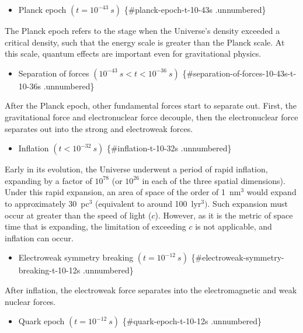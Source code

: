 \documentclass[11pt,a4paper,notoc]{tufte-handout}
\providecommand{\tightlist}{%
  \setlength{\itemsep}{0pt}\setlength{\parskip}{0pt}}
\begin{document}
\begin{itemize}
\tightlist
\item
  Planck epoch \((t = 10^{-43}~s)\) \{\#planck-epoch-t-10-43s .unnumbered\}
\end{itemize}

The Planck epoch refers to the stage when the Universe's density
exceeded a critical density, such that the energy scale is greater than
the Planck scale. At this scale, quantum effects are important even for
gravitational physics.

\begin{itemize}
\tightlist
\item
  Separation of forces \((10^{-43}~s < t < 10^{-36}~s)\) \{\#separation-of-forces-10-43s-t-10-36s .unnumbered\}
\end{itemize}

After the Planck epoch, other fundamental forces start to separate out.
First, the gravitational force and electronuclear force decouple, then
the electronuclear force separates out into the strong and electroweak
forces.

\begin{itemize}
\tightlist
\item
  Inflation \((t < 10^{-32}~s)\) \{\#inflation-t-10-32s .unnumbered\}
\end{itemize}

Early in its evolution, the Universe underwent a period of rapid
inflation, expanding by a factor of \(10^{78}\) (or \(10^{26}\) in each of
the three spatial dimensions). Under this rapid expansion, an area of
space of the order of 1~nm\(^{3}\) would expand to approximately
30~pc\(^{3}\) (equivalent to around 100~lyr\(^{3})\). Such expansion must
occur at greater than the speed of light (\(c\)). However, as it is the
metric of space time that is expanding, the limitation of exceeding \(c\)
is not applicable, and inflation can occur.

\begin{itemize}
\tightlist
\item
  Electroweak symmetry breaking \((t = 10^{-12}~s)\) \{\#electroweak-symmetry-breaking-t-10-12s .unnumbered\}
\end{itemize}

After inflation, the electroweak force separates into the
electromagnetic and weak nuclear forces.

\begin{itemize}
\tightlist
\item
  Quark epoch \((t = 10^{-12}~s)\) \{\#quark-epoch-t-10-12s .unnumbered\}
\end{itemize}
\end{document}
